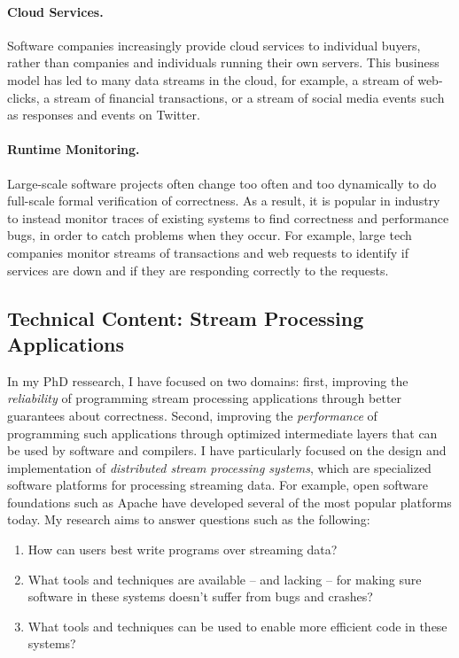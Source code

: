 \documentclass{article}
\begin{document}
\paragraph*{Cloud Services.}
Software companies increasingly provide cloud services to individual buyers,
rather than companies and individuals running their own servers.
This business model has led to many data streams in the cloud, for example,
a stream of web-clicks, a stream of financial transactions,
or a stream of social media events such as responses and events on Twitter.

\paragraph*{Runtime Monitoring.}
Large-scale software projects often change too often and too dynamically to do full-scale formal verification of correctness.
As a result, it is popular in industry to instead monitor traces of existing systems to find correctness and performance bugs, in order to
catch problems when they occur.
For example, large tech companies monitor streams of transactions and web
requests to identify if services are down and if they are responding correctly to the requests.

\subsection*{Technical Content: Stream Processing Applications}

In my PhD ressearch, I have focused on two domains: first, improving the \emph{reliability} of programming stream processing applications through better guarantees about correctness. Second, improving the \emph{performance} of programming such applications through optimized intermediate layers that can be used by software and compilers.
I have particularly focused on the design and implementation of \emph{distributed stream processing systems}, which are specialized software platforms for processing streaming data.
For example, open software foundations such as Apache have developed several of the most popular platforms today.
My research aims to answer questions such as the following:
\begin{enumerate}
\item How can users best write programs over streaming data?
\item What tools and techniques are available -- and lacking -- for making sure software in these systems doesn't suffer from bugs and crashes?
\item What tools and techniques can be used to enable more efficient code in these systems?
\end{enumerate}
\end{document}
